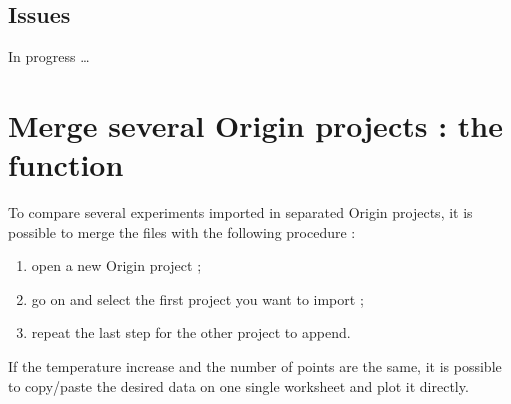 \documentclass[a4paper, 11pt, raggedright, parskip, sans, colorful]{tufte-style-article}
\begin{document}
\subsection{Issues}

In progress \dots


\section{Merge several Origin projects : the  function}

To compare several experiments imported in separated Origin projects, it is possible to merge the  files with the following procedure :
\begin{enumerate}\tightlist
    \item open a new Origin project ;
    \item go on  and select the first project you want to import ;
    \item repeat the last step for the other project to append.
\end{enumerate}

If the temperature increase and the number of points are the same, it is possible to copy/paste the desired data on one single worksheet and plot it directly.
\end{document}
